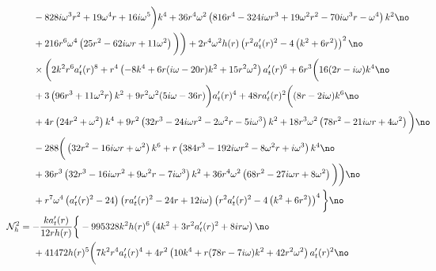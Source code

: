 \documentclass[preprintnumbers,aps,prd,longbibliography,nofootinbib,nobibnotes,amsmath,amssymb]{revtex4}
\begin{document}
\begin{align}
		&-828 i \omega ^3 r^2+19 \omega ^4 r+16 i \omega ^5\bigg) k^4+36 r^4 \omega ^2 \left(816 r^4-324 i \omega  r^3+19 \omega ^2 r^2-70 i \omega ^3 r-\omega ^4\right) k^2\no\\
		&+216 r^6 \omega ^4 \left(25 r^2-62 i \omega  r+11 \omega ^2\right)\bigg)\bigg) +2 r^4 \omega^2 h(r)\left(r^2 a_t'(r)^2-4 \left(k^2+6 r^2\right)\right)^2 \no\\
		&\times \bigg(2 k^2 r^6 a_t'(r)^8+r^4 \left(-8 k^4+6 r (i \omega -20 r) k^2+15 r^2 \omega ^2\right) a_t'(r)^6+6 r^3 \bigg(16 (2 r-i \omega ) k^4\no\\
		&+3 \left(96 r^3+11 \omega ^2 r\right) k^2+9 r^2 \omega^2 (5 i \omega -36 r)\bigg) a_t'(r)^4+48 r a_t'(r)^2 \bigg((8 r-2 i \omega ) k^6\no\\
		&+4 r \left(24 r^2+\omega ^2\right) k^4+9 r^2 \left(32 r^3-24 i \omega  r^2-2 \omega ^2 r-5 i \omega ^3\right) k^2+18 r^3 \omega ^2 \left(78 r^2-21 i \omega  r+4 \omega^2\right)\bigg)\no\\
		& -288 \bigg(\left(32 r^2-16 i \omega  r+\omega ^2\right) k^6+r \left(384 r^3-192 i \omega  r^2-8 \omega ^2 r+i \omega ^3\right) k^4\no\\
		&+36 r^3 \left(32 r^3-16 i \omega  r^2+9 \omega ^2 r-7 i \omega ^3\right) k^2+36 r^4 \omega^2 \left(68 r^2-27 i \omega  r+8 \omega ^2\right)\bigg)\bigg)\no\\
		& +r^7 \omega ^4 \left(a_t'(r)^2-24\right) \left(r a_t'(r)^2-24 r+12 i \omega \right) \left(r^2 a_t'(r)^2-4 \left(k^2+6 r^2\right)\right)^4\bigg\}\no\\
		&\hspace{-1cm}\mathcal{N}_h^2 =  - \frac{k a_t'(r)}{12 r h(r)} \bigg\{-995328 k^2 h(r)^6  \left(4 k^2+3 r^2 a_t'(r){}^2+8 i r \omega \right)\no\\
		& +41472 h(r)^5 \bigg(7 k^2 r^4 a_t'(r)^4+4 r^2 \left(10 k^4+r (78 r-7 i \omega ) k^2+42 r^2 \omega ^2\right) a_t'(r)^2\no
		\end{align}
\end{document}

